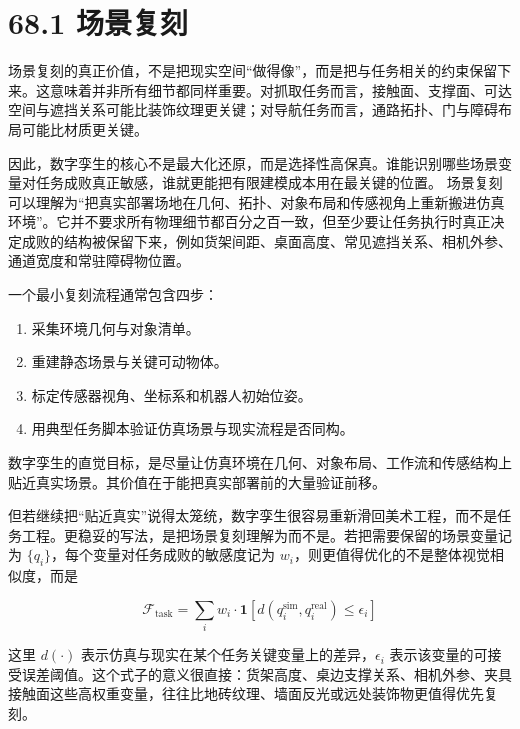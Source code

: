\section*{68.1 场景复刻}


场景复刻的真正价值，不是把现实空间“做得像”，而是把与任务相关的约束保留下来。这意味着并非所有细节都同样重要。对抓取任务而言，接触面、支撑面、可达空间与遮挡关系可能比装饰纹理更关键；对导航任务而言，通路拓扑、门与障碍布局可能比材质更关键。

因此，数字孪生的核心不是最大化还原，而是选择性高保真。谁能识别哪些场景变量对任务成败真正敏感，谁就更能把有限建模成本用在最关键的位置。 场景复刻可以理解为“把真实部署场地在几何、拓扑、对象布局和传感视角上重新搬进仿真环境”。它并不要求所有物理细节都百分之百一致，但至少要让任务执行时真正决定成败的结构被保留下来，例如货架间距、桌面高度、常见遮挡关系、相机外参、通道宽度和常驻障碍物位置。

一个最小复刻流程通常包含四步：

\begin{enumerate}
\item 采集环境几何与对象清单。
\item 重建静态场景与关键可动物体。
\item 标定传感器视角、坐标系和机器人初始位姿。
\item 用典型任务脚本验证仿真场景与现实流程是否同构。
\end{enumerate}

数字孪生的直觉目标，是尽量让仿真环境在几何、对象布局、工作流和传感结构上贴近真实场景。其价值在于能把真实部署前的大量验证前移。

但若继续把“贴近真实”说得太笼统，数字孪生很容易重新滑回美术工程，而不是任务工程。更稳妥的写法，是把场景复刻理解为\texttt{}而不是\texttt{}。若把需要保留的场景变量记为 \(\{q_i\}\)，每个变量对任务成败的敏感度记为 \(w_i\)，则更值得优化的不是整体视觉相似度，而是

\begingroup
\scriptsize
\begin{equation*}
\mathcal{F}_{\text{task}}
=
\sum_i w_i \cdot \mathbf{1}[d(q_i^{\text{sim}}, q_i^{\text{real}}) \le \epsilon_i]
\end{equation*}
\endgroup

这里 \(d(\cdot)\) 表示仿真与现实在某个任务关键变量上的差异，\(\epsilon_i\) 表示该变量的可接受误差阈值。这个式子的意义很直接：货架高度、桌边支撑关系、相机外参、夹具接触面这些高权重变量，往往比地砖纹理、墙面反光或远处装饰物更值得优先复刻。

